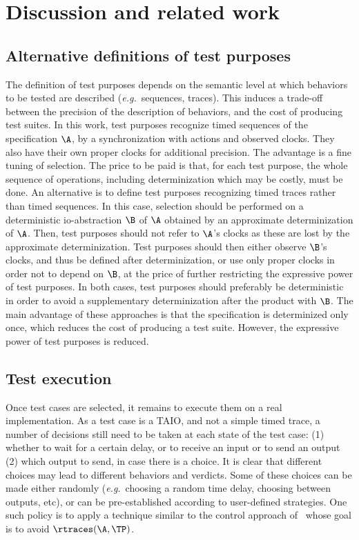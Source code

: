 \documentclass{LMCS}
\theoremstyle{plain}\newtheorem{proposition}[thm]{Proposition}
\def\eg{{\em e.g.}}
\begin{document}
\section{Discussion and related work}
\label{sec-discuss}

\subsection*{Alternative definitions of test purposes}
The definition of test purposes depends on the semantic level at which
behaviors to be tested are described (\eg~sequences, traces).  This
induces a trade-off between the precision of the description of
behaviors, and the cost of producing test suites.  In this work, test
purposes recognize timed sequences of the specification $\A$, by a
synchronization with actions and observed clocks.  They also have
their own proper clocks for additional precision.  The advantage is a
fine tuning of selection.  The price to be paid is that, for each test
purpose, the whole sequence of operations, including determinization
which may be costly, must be done.  An alternative is to define test
purposes recognizing timed traces rather than timed sequences.  In
this case, selection should be performed on a deterministic io-abstraction $\B$ of
$\A$ obtained by an approximate determinization of $\A$.  
Then, test purposes should not refer to $\A$'s clocks as these
are lost by the approximate determinization.  Test purposes should
then either observe $\B$'s clocks, and thus be defined after
determinization, or use only proper clocks in order not to depend on
$\B$, at the price of further restricting the expressive power of test
purposes.  In both cases, test purposes should preferably be
deterministic in order to avoid a supplementary determinization after
the product with $\B$.  The main advantage of these approaches is that
the specification is determinized only once, which reduces the cost of
producing a test suite.  However, the expressive power of test
purposes is reduced.



\subsection*{Test execution}
Once test cases are selected, it remains to execute them on a real
implementation.  As a test case is a TAIO, and not a simple timed
trace, a number of decisions still need to be taken at each state of
the test case: (1) whether to wait for a certain delay, or to receive
an input or to send an output (2) which output to send, in case there
is a choice.  It is clear that different choices may lead to different
behaviors and verdicts.  Some of these choices can be made either
randomly (\eg~choosing a random time delay, choosing between outputs,
etc), or can be pre-established according to user-defined strategies.
One such policy is to apply a technique similar to the control
approach of~\cite{DavidLarsenLiNielsen-ICST09} whose goal is to avoid
$\rtraces(\A,\TP)$.
\end{document}
